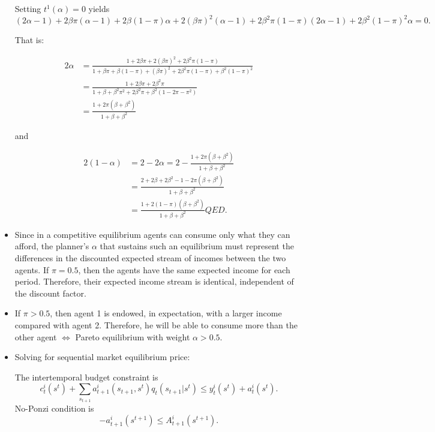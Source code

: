 \documentclass[12pt,a4paper]{article}
\begin{document}
\begin{itemize}
  Setting  $t^1(\alpha)=0$ yields
  $$
  (2\alpha - 1) + 2\beta \pi(\alpha - 1) + 2\beta (1 - \pi)\alpha + 2(\beta \pi)^2 (\alpha - 1) + 2 \beta^2 \pi (1 - \pi) (2 \alpha - 1) + 2 \beta^2 (1 - \pi)^2 \alpha = 0.
  $$

  That is:

  \begin{align*}
    2 \alpha & = \frac{1 + 2\beta\pi + 2 (\beta\pi)^2 + 2\beta^2\pi(1-\pi)}{1 + \beta\pi + \beta(1 - \pi) + (\beta\pi)^2 + 2 \beta^2\pi(1-\pi) + \beta^2 (1 - \pi)^2} \\
    & = \frac{1 + 2\beta\pi + 2\beta^2\pi }{1 + \beta + \beta^2\pi^2 + 2\beta^2 \pi + \beta^2(1-2\pi-\pi^2)} \\
    & = \frac{1 + 2\pi(\beta + \beta^2)}{1 + \beta + \beta^2}
  \end{align*}

  and

  \begin{align*}
    2(1-\alpha) & = 2 - 2\alpha = 2 -\frac{1 + 2\pi(\beta + \beta^2)}{1 + \beta + \beta^2} \\
    & = \frac{2 + 2\beta + 2 \beta^2 - 1 - 2\pi(\beta + \beta^2)}{1 + \beta + \beta^2} \\
    & = \frac{1 + 2(1 -\pi)(\beta + \beta^2)}{1 + \beta + \beta^2} QED.
  \end{align*}

  \item Since in a competitive equilibrium agents can consume only what they can afford, the planner's $\alpha$ that sustains such an equilibrium must represent the differences in the discounted expected stream of incomes between the two agents. If $\pi = 0.5$, then the agents have the same expected income for each period. Therefore, their expected income stream is identical, independent of the discount factor.

  \item If $\pi > 0.5$, then agent 1 is endowed, in expectation, with a larger income compared with agent 2. Therefore, he will be able to consume more than the other agent $\Leftrightarrow$  Pareto equilibrium with weight $\alpha > 0.5$.

\item Solving for sequential market equilibrium price:

The intertemporal budget constraint is
\begin{equation*}
    c_{t}^{i}(s^t)+\sum_{s_{t+1}}a_{t+1}^{i}(s_{t+1},s^{t})q_t(s_{t+1}|s^{t})\leq y_{t}^{i}(s^t)+a_{t}^{i}(s^t).
\end{equation*}
No-Ponzi condition is
\begin{equation*}
    -a_{t+1}^{i}(s^{t+1}) \leq A_{t+1}^{i}(s^{t+1}).
\end{equation*}


\end{itemize}
\end{document}
